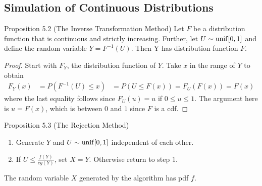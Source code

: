 \subsection{Simulation of Continuous Distributions}
\begin{boks}{Proposition 5.2 (The Inverse Transformation Method)}
  Let $F$ be a distribution function that is continuous and strictly increasing. Further, let $U \sim \operatorname{unif}[0,1]$ and define the random variable $Y = F^{-1}(U)$. Then Y has distribution function $F$.
\end{boks}
\begin{proof}
  Start with $F_Y$, the distribution function of $Y$. Take $x$ in the range of $Y$ to obtain
  \begin{align*}
    F_Y(x) &= P(F^{-1}(U) \leq x)
    &= P(U \leq F(x)) = F_U(F(x)) = F(x)
  \end{align*}
  where the last equality follows since $F_U(u) = u$ if $0 \leq u \leq 1$. The argument here is $u = F(x)$, which is between $0$ and $1$ since $F$ is a cdf.
\end{proof}
\begin{boks}{Proposition 5.3 (The Rejection Method)}
  \begin{enumerate}[label = \arabic*.]
    \item Generate $Y$ and $U \sim \operatorname{unif}[0,1]$ independent of each other.
    \item If $U \leq \frac{f(Y)}{cg(Y)}$, set $X = Y$. Otherwise return to step $1$.
  \end{enumerate}
  The random variable $X$ generated by the algorithm has pdf $f$.
\end{boks}
